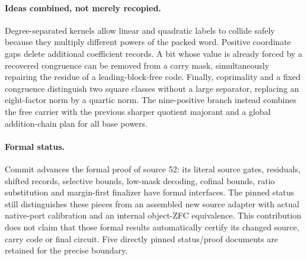 \paragraph{Ideas combined, not merely recopied.}
Degree-separated kernels allow linear and quadratic labels to collide safely because they multiply different powers of the packed word. Positive coordinate gaps delete additional coefficient records. A bit whose value is already forced by a recovered congruence can be removed from a carry mask, simultaneously repairing the residue of a leading-block-free code. Finally, coprimality and a fixed congruence distinguish two square classes without a large separator, replacing an eight-factor norm by a quartic norm. The nine-positive branch instead combines the free carrier with the previous sharper quotient majorant and a global addition-chain plan for all base powers.

\paragraph{Formal status.}
Commit  advances the formal proof of source 52: its literal source gates, residuals, shifted records, selective bounds, low-mask decoding, cofinal bounds, ratio substitution and margin-first finalizer have formal interfaces. The pinned status still distinguishes these pieces from an assembled new source adapter with actual native-port calibration and an internal object-ZFC equivalence. This contribution does not claim that those formal results automatically certify its changed source, carry code or final circuit. Five directly pinned status/proof documents are retained for the precise boundary.
